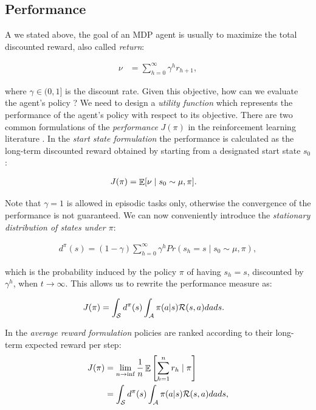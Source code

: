 \subsection{Performance}
A we stated above, the goal of an MDP agent is usually to maximize the total discounted reward, also called \emph{return}:

\begin{align}
\nu &= \sum_{h=0}^{\infty}\gamma^{h}r_{h+1},
\end{align}

where $\gamma\in(0,1]$ is the discount rate. Given this objective, how can we evaluate the agent's policy ? We need to design a \emph{utility function} which represents the performance of the agent's policy with respect to its objective. There are two common formulations of the \emph{performance} $J(\pi)$ in the reinforcement learning literature \cite{sutton2000policy}.
In the \emph{start state formulation} the performance is calculated as the long-term discounted reward obtained by starting from a designated start state $s_0$:

\begin{align}
J(\pi) &=  \mathop{\mathbb{E}}[\nu\mid s_0\sim\mu,\pi]. \label{eq:Jstartstate}
\end{align}


Note that $\gamma=1$ is allowed in episodic tasks only, otherwise the convergence of the performance is not guaranteed. We can now conveniently introduce the \emph{stationary distribution of states under $\pi$}:

\begin{align} 
d^{\pi}(s) = (1 - \gamma)\sum_{h=0}^{\infty}\gamma^h Pr(s_h=s\mid s_0\sim\mu,\pi) \label{eq:ssdistribution},
\end{align}

which is the probability induced by the policy $\pi$  of having $s_h=s$, discounted by $\gamma^h$, when $t\to\infty$. This allows us to rewrite the performance measure as:

\begin{align}
J(\pi) &=  \int_{\mathcal{S}}d^{\pi}(s)\int_{\mathcal{A}}\pi(a|s)\mathcal{R}(s, a)dads.
\end{align}

In the \emph{average reward formulation} policies are ranked according to their long-term expected reward per step:
\begin{align}
J(\pi)
&=  \lim_{n\to\inf}\frac{1}{n}\mathop{\mathbb{E}}\left[\sum_{h=1}^{n}r_h\mid\pi\right]  \\
& = \int_{\mathcal{S}}d^{\pi}(s)\int_{\mathcal{A}}\pi(a|s)\mathcal{R}(s, a)dads, \nonumber
\end{align}

